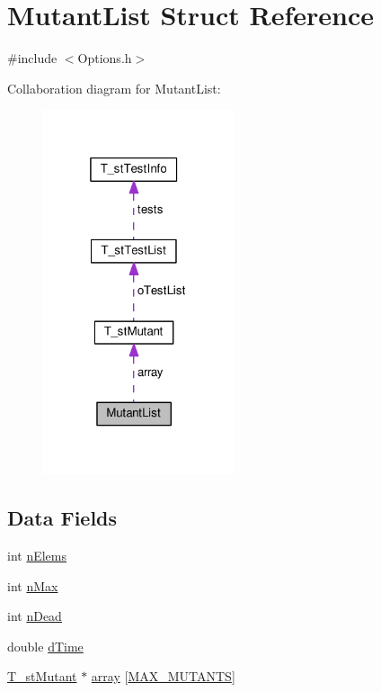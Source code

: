 \hypertarget{structMutantList}{\section{Mutant\-List Struct Reference}
\label{structMutantList}
}


{\ttfamily \#include $<$Options.\-h$>$}



Collaboration diagram for Mutant\-List\-:\nopagebreak
\begin{figure}[H]
\begin{center}
\leavevmode
\includegraphics[width=160pt]{structMutantList__coll__graph}
\end{center}
\end{figure}
\subsection*{Data Fields}
\begin{DoxyCompactItemize}
\item 
int \hyperlink{structMutantList_abfe5da02681fadfbc5c85c150a880508}{n\-Elems}
\item 
int \hyperlink{structMutantList_a0238362172eaecea60b5cc88e4406f8f}{n\-Max}
\item 
int \hyperlink{structMutantList_a52c03779cb04c5d8a5344c70e5e39b89}{n\-Dead}
\item 
double \hyperlink{structMutantList_a43fbe4e680f5b4d1f4c001f793d2aa40}{d\-Time}
\item 
\hyperlink{structT__stMutant}{T\-\_\-st\-Mutant} $\ast$ \hyperlink{structMutantList_a880314b02f26bbaebb4277d514f6d9de}{array} \mbox{[}\hyperlink{Options_8h_a7b5fa9fc08e6e43e329c804ac562bd00}{M\-A\-X\-\_\-\-M\-U\-T\-A\-N\-T\-S}\mbox{]}
\end{DoxyCompactItemize}


